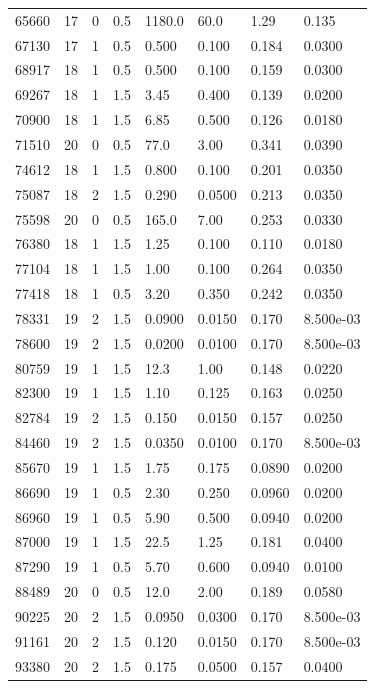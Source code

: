 \documentclass[preview]{standalone}
\begin{document}
{{{\begin{tabular}{L{1.2cm}C{1.2cm} C{0.3cm}C{0.5cm} C{1.4cm}C{1.4cm} C{1.4cm}C{1.4cm}}
  65660  &    17  & 0     & 0.5 &  1180.0  & 60.0  & 1.29 &  0.135   \\ 
  67130  &    17  & 1     & 0.5 &  0.500  & 0.100  & 0.184 &  0.0300   \\ 
  68917  &    18  & 1     & 0.5 &  0.500  & 0.100  & 0.159 &  0.0300   \\ 
  69267  &    18  & 1     & 1.5 &  3.45  & 0.400  & 0.139 &  0.0200   \\ 
  70900  &    18  & 1     & 1.5 &  6.85  & 0.500  & 0.126 &  0.0180   \\ 
  71510  &    20  & 0     & 0.5 &  77.0  & 3.00  & 0.341 &  0.0390   \\ 
  74612  &    18  & 1     & 1.5 &  0.800  & 0.100  & 0.201 &  0.0350   \\ 
  75087  &    18  & 2     & 1.5 &  0.290  & 0.0500  & 0.213 &  0.0350   \\ 
  75598  &    20  & 0     & 0.5 &  165.0  & 7.00  & 0.253 &  0.0330   \\ 
  76380  &    18  & 1     & 1.5 &  1.25  & 0.100  & 0.110 &  0.0180   \\ 
  77104  &    18  & 1     & 1.5 &  1.00  & 0.100  & 0.264 &  0.0350   \\ 
  77418  &    18  & 1     & 0.5 &  3.20  & 0.350  & 0.242 &  0.0350   \\ 
  78331  &    19  & 2     & 1.5 &  0.0900  & 0.0150  & 0.170 &  8.500e-03   \\ 
  78600  &    19  & 2     & 1.5 &  0.0200  & 0.0100  & 0.170 &  8.500e-03   \\ 
  80759  &    19  & 1     & 1.5 &  12.3  & 1.00  & 0.148 &  0.0220   \\ 
  82300  &    19  & 1     & 1.5 &  1.10  & 0.125  & 0.163 &  0.0250   \\ 
  82784  &    19  & 2     & 1.5 &  0.150  & 0.0150  & 0.157 &  0.0250   \\ 
  84460  &    19  & 2     & 1.5 &  0.0350  & 0.0100  & 0.170 &  8.500e-03   \\ 
  85670  &    19  & 1     & 1.5 &  1.75  & 0.175  & 0.0890 &  0.0200   \\ 
  86690  &    19  & 1     & 0.5 &  2.30  & 0.250  & 0.0960 &  0.0200   \\ 
  86960  &    19  & 1     & 0.5 &  5.90  & 0.500  & 0.0940 &  0.0200   \\ 
  87000  &    19  & 1     & 1.5 &  22.5  & 1.25  & 0.181 &  0.0400   \\ 
  87290  &    19  & 1     & 0.5 &  5.70  & 0.600  & 0.0940 &  0.0100   \\ 
  88489  &    20  & 0     & 0.5 &  12.0  & 2.00  & 0.189 &  0.0580   \\ 
  90225  &    20  & 2     & 1.5 &  0.0950  & 0.0300  & 0.170 &  8.500e-03   \\ 
  91161  &    20  & 2     & 1.5 &  0.120  & 0.0150  & 0.170 &  8.500e-03   \\ 
  93380  &    20  & 2     & 1.5 &  0.175  & 0.0500  & 0.157 &  0.0400   \\ 
\hline 
\end{tabular} 

}}}
\end{document}
